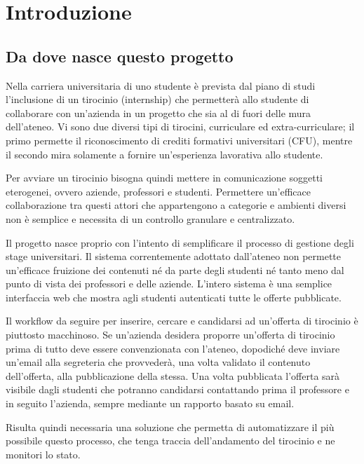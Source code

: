 \nocite{*}

\chapter{Introduzione}

\section{Da dove nasce questo progetto}

Nella carriera universitaria di uno studente è prevista dal piano di studi l'inclusione di un tirocinio (internship) che permetterà allo studente di collaborare con un'azienda in un progetto che sia al di fuori delle mura dell'ateneo. Vi sono due diversi tipi di tirocini, curriculare ed extra-curriculare; il primo permette il riconoscimento di crediti formativi universitari (CFU), mentre il secondo mira solamente a fornire un'esperienza lavorativa allo studente.

Per avviare un tirocinio bisogna quindi mettere in comunicazione soggetti eterogenei, ovvero aziende, professori e studenti. Permettere un'efficace collaborazione tra questi attori che appartengono a categorie e ambienti diversi non è semplice e necessita di un controllo granulare e centralizzato.

Il progetto \projectName nasce proprio con l'intento di semplificare il processo di gestione degli stage universitari. Il sistema correntemente adottato dall'ateneo non permette un'efficace fruizione dei contenuti né da parte degli studenti né tanto meno dal punto di vista dei professori e delle aziende. L'intero sistema è una semplice interfaccia web che mostra agli studenti autenticati tutte le offerte pubblicate.

Il workflow da seguire per inserire, cercare e candidarsi ad un'offerta di tirocinio è piuttosto macchinoso. Se un'azienda desidera proporre un'offerta di tirocinio prima di tutto deve essere convenzionata con l'ateneo, dopodiché deve inviare un'email alla segreteria che provvederà, una volta validato il contenuto dell'offerta, alla pubblicazione della stessa. Una volta pubblicata l'offerta sarà visibile dagli studenti che potranno candidarsi contattando prima il professore e in seguito l'azienda, sempre mediante un rapporto basato su email. 

Risulta quindi necessaria una soluzione che permetta di automatizzare il più possibile questo processo, che tenga traccia dell'andamento del tirocinio e ne monitori lo stato.



